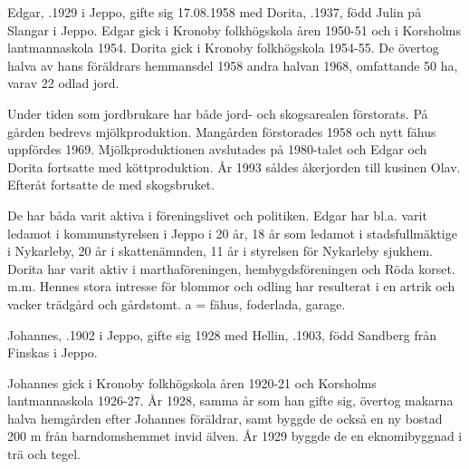 
%
Edgar, .1929 i Jeppo, gifte sig 17.08.1958 med Dorita, .1937, född Julin på Slangar i Jeppo.
Edgar gick i Kronoby folkhögskola åren 1950-51 och i Korsholms lantmannaskola 1954. Dorita gick i Kronoby folkhögskola 1954-55. De övertog halva av hans föräldrars hemmansdel 1958 andra halvan 1968, omfattande 50 ha, varav 22 odlad jord.

Under tiden som jordbrukare har både jord- och skogsarealen förstorats. På gården bedrevs mjölkproduktion. Mangården förstorades 1958 och nytt fähus uppfördes 1969. Mjölkproduktionen avslutades på 1980-talet och Edgar och Dorita fortsatte med köttproduktion. År 1993 såldes åkerjorden till kusinen Olav. Efteråt fortsatte de med skogsbruket.


De har båda varit aktiva i föreningslivet och politiken. Edgar har bl.a. varit ledamot i kommunstyrelsen i Jeppo i 20 år, 18 år som ledamot i stadsfullmäktige i Nykarleby, 20 år i skattenämnden, 11 år i styrelsen för Nykarleby sjukhem. Dorita har varit aktiv i marthaföreningen, hembygdsföreningen och Röda korset. m.m. Hennes stora intresse för blommor och odling har resulterat i en artrik och vacker trädgård och gårdstomt. a = fähus, foderlada, garage.


%
Johannes, .1902 i Jeppo, gifte sig 1928 med Hellin, .1903, född Sandberg från Finskas i Jeppo.
\begin{jhchildren}
  \item {}
  \item {}
  \item {}
\end{jhchildren}
Johannes gick i Kronoby folkhögskola åren 1920-21 och Korsholms lantmannaskola 1926-27. År 1928, samma år som han gifte sig, övertog makarna halva hemgården efter Johannes föräldrar, samt byggde de också en ny bostad 200 m från barndomshemmet invid älven. År 1929 byggde de en eknomibyggnad i trä och tegel.

